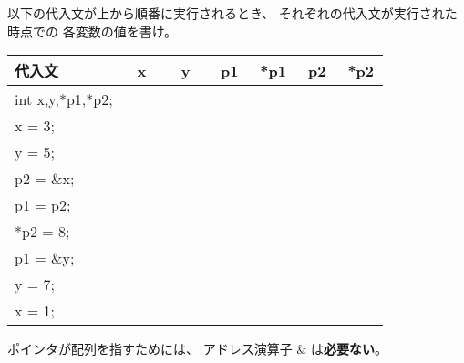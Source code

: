 \documentclass[12pt,a4j]{jarticle}
\newcounter{toi}
\def\toi{%
\bigskip\bigskip\noindent
\addtocounter{toi}{1}
\shadowbox{\bfseries\large 問\thetoi}
\nopagebreak[4]\bigskip\nopagebreak[4]
}
\begin{document}
\toi

以下の代入文が上から順番に実行されるとき、
それぞれの代入文が実行された時点での
各変数の値を書け。


\begin{center}\ttfamily
 \begin{tabular}{|l|c|c|c|c|c|c|}\hline
  代入文 & x & y & p1 & *p1 & p2 & *p2\\ \hline\hline
  int x,y,*p1,*p2; & 　　& 　　& 　　& 　　& 　　& 　　\\  \cline{2-7}   
  x = 3;   & & & & & & \\  \cline{2-7}   
  y = 5;   & & & & & & \\  \cline{2-7}   
  p2 = \&x;& & & & & & \\  \cline{2-7}   
  p1 = p2; & & & & & & \\  \cline{2-7}   
  *p2 = 8; & & & & & & \\  \cline{2-7}   
  p1 = \&y;& & & & & & \\  \cline{2-7}   
  y = 7;   & & & & & & \\  \cline{2-7}   
  x = 1;   & & & & & & \\  \hline
 \end{tabular}
\end{center}










\toi

ポインタが配列を指すためには、
アドレス演算子 {\ttfamily \&} は{\bfseries 必要ない}。
\end{document}
